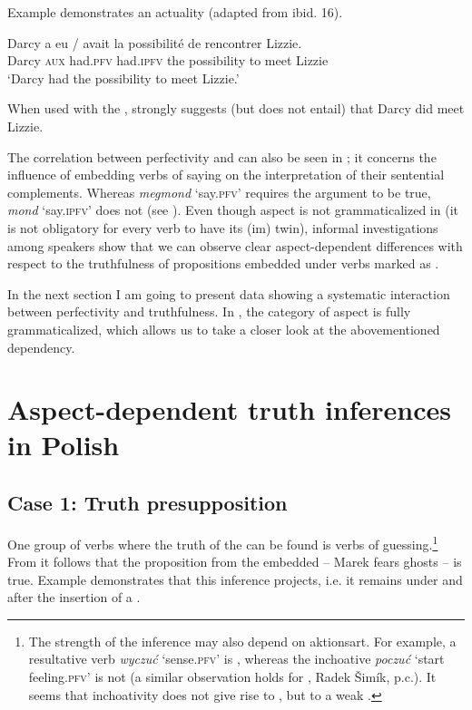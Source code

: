 \documentclass[output=paper,  modfonts,  newtxmath,  hidelinks		  ]{langscibook}
\begin{document}
\noindent Example  demonstrates an actuality  (adapted from ibid. 16).


\ea\label{21:11}
\gll Darcy a eu / avait la possibilité de rencontrer Lizzie. \\
	Darcy \textsc{aux} had.\textsc{pfv} {} had.\textsc{ipfv} the possibility to meet Lizzie\\
\glt `Darcy had the possibility to meet Lizzie.'
\z

\noindent When used with the ,  strongly suggests (but does not entail) that Darcy did meet Lizzie.

The correlation between perfectivity and  can also be seen in ; it concerns the influence of embedding verbs of saying on the interpretation of their sentential complements. Whereas \textit{megmond} ‘say.\textsc{pfv}’ requires the argument to be true, \textit{mond} ‘say.\textsc{ipfv}’ does not (see \citealt{Kiefer1986}). Even though aspect is not grammaticalized in  (it is not obligatory for every verb to have its (im) twin), informal investigations among speakers show that we can observe clear aspect-dependent differences with respect to the truthfulness of propositions embedded under verbs marked as .

In the next section I am going to present  data showing a systematic interaction between perfectivity and truthfulness. In , the category of aspect is fully grammaticalized, which allows us to take a closer look at the abovementioned dependency. 

\section{Aspect-dependent truth inferences in Polish}\label{21:aspinf}
\subsection{Case 1: {T}ruth presupposition}

One group of verbs where the truth  of the  can be found is verbs of guessing.\footnote{The strength of the inference may also depend on aktionsart. For example, a resultative verb \textit{wyczuć} `sense.\textsc{pfv}’ is , whereas the inchoative \textit{poczuć} `start feeling.\textsc{pfv}’ is not (a similar observation holds for , Radek \v{S}imík, p.c.). It seems that inchoativity does not give rise to , but to a weak .} From  it follows that the proposition from the embedded  – Marek fears ghosts – is true. Example  demonstrates that this inference projects, i.e. it remains under  and after the insertion of a .
\end{document}
